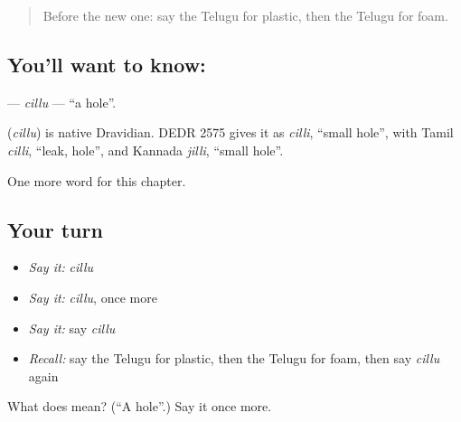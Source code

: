 \label{lesson:TE-C271-cillu}



\begin{quote}
Before the new one: say the Telugu for plastic, then the Telugu for foam.
\end{quote}

\subsection*{You'll want to know: }
\textbf{} — \emph{cillu} — \textquotedblleft{}a hole\textquotedblright{}.

\begin{cousinweb}
\textbf{} (\emph{cillu}) is native Dravidian. DEDR 2575 gives it as \emph{cilli}, \textquotedblleft{}small hole\textquotedblright{}, with Tamil \emph{cilli}, \textquotedblleft{}leak, hole\textquotedblright{}, and Kannada \emph{jilli}, \textquotedblleft{}small hole\textquotedblright{}.
\end{cousinweb}

\begin{grammarlens}[title={What you've built}]
One more word for this chapter.
\end{grammarlens}

\subsection*{Your turn}
\begin{itemize}
\raggedright
  \item \emph{Say it:} \emph{cillu}
  \item \emph{Say it:} \emph{cillu}, once more
  \item \emph{Say it:} say \emph{cillu}
  \item \emph{Recall:} say the Telugu for plastic, then the Telugu for foam, then say \emph{cillu} again
\end{itemize}

\begin{tcolorbox}[breakable,colback=teal!4,colframe=teal!35!black,title={Before you move on}]
What does  mean? (\textquotedblleft{}A hole\textquotedblright{}.) Say it once more.
\end{tcolorbox}
